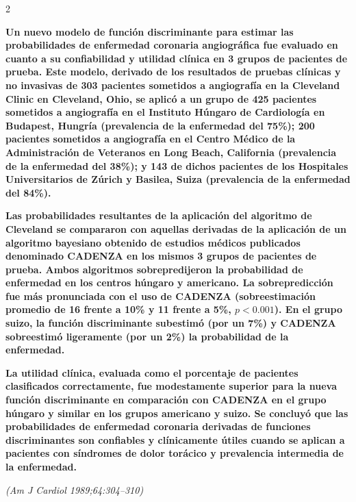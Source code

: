 \documentclass[12pt,letterpaper]{article}
\begin{document}
\begin{multicols}{2}

\noindent\textbf{\selectfont
Un nuevo modelo de función discriminante para estimar las probabilidades de 
enfermedad coronaria angiográfica fue evaluado en cuanto a su confiabilidad y 
utilidad clínica en 3 grupos de pacientes de prueba. Este modelo, derivado de 
los resultados de pruebas clínicas y no invasivas de 303 pacientes sometidos a 
angiografía en la Cleveland Clinic en Cleveland, Ohio, se aplicó a un grupo de 
425 pacientes sometidos a angiografía en el Instituto Húngaro de Cardiología en 
Budapest, Hungría (prevalencia de la enfermedad del 75\%); 200 pacientes 
sometidos a angiografía en el Centro Médico de la Administración de Veteranos en 
Long Beach, California (prevalencia de la enfermedad del 38\%); y 143 de dichos 
pacientes de los Hospitales Universitarios de Zúrich y Basilea, Suiza 
(prevalencia de la enfermedad del 84\%).}

\smallskip
\noindent\textbf{\selectfont
Las probabilidades resultantes de la aplicación del algoritmo de Cleveland se compararon con aquellas derivadas de la aplicación de un algoritmo bayesiano obtenido de estudios médicos publicados denominado CADENZA en los mismos 3 grupos de pacientes de prueba. Ambos algoritmos sobrepredijeron la probabilidad de enfermedad en los centros húngaro y americano. La sobrepredicción fue más pronunciada con el uso de CADENZA (sobreestimación promedio de 16 frente a 10\% y 11 frente a 5\%, $p < 0.001$). En el grupo suizo, la función discriminante subestimó (por un 7\%) y CADENZA sobreestimó ligeramente (por un 2\%) la probabilidad de la enfermedad.}

\smallskip
\noindent\textbf{\selectfont
La utilidad clínica, evaluada como el porcentaje de pacientes clasificados correctamente, fue modestamente superior para la nueva función discriminante en comparación con CADENZA en el grupo húngaro y similar en los grupos americano y suizo. Se concluyó que las probabilidades de enfermedad coronaria derivadas de funciones discriminantes son confiables y clínicamente útiles cuando se aplican a pacientes con síndromes de dolor torácico y prevalencia intermedia de la enfermedad.}

\vspace{0.2cm}
\begin{flushright}
\textit{\small (Am J Cardiol 1989;64:304--310)}
\end{flushright}


\end{multicols}
\end{document}
